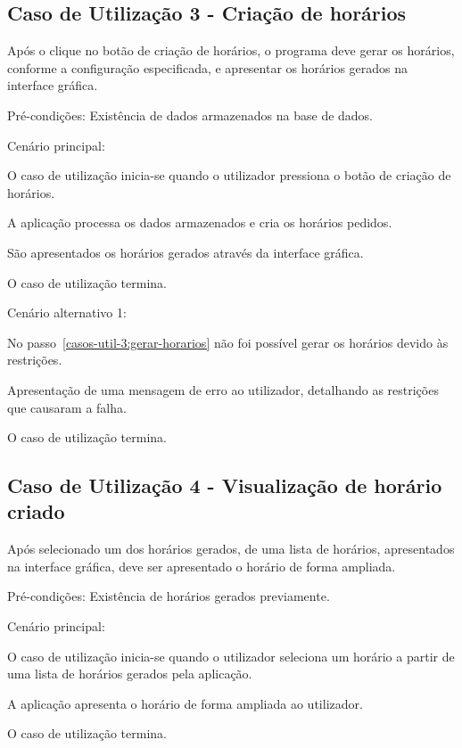 \subsection*{Caso de Utilização 3 - Criação de horários}
Após o clique no botão de criação de horários, o programa deve gerar os horários, conforme a configuração especificada, e apresentar os horários gerados na interface gráfica.

Pré-condições: Existência de dados armazenados na base de dados.

Cenário principal:

\begin{compactenum}
    \item O caso de utilização inicia-se quando o utilizador pressiona o botão de criação de horários.
    \item A aplicação processa os dados armazenados e cria os horários pedidos. \label{casos-util-3:gerar-horarios}
    \item São apresentados os horários gerados através da interface gráfica.
    \item O caso de utilização termina.
\end{compactenum}

Cenário alternativo 1:

\begin{compactenum}
    \item No passo~\ref{casos-util-3:gerar-horarios} não foi possível gerar os horários devido às restrições.
    \item Apresentação de uma mensagem de erro ao utilizador, detalhando as restrições que causaram a falha.
    \item O caso de utilização termina.
\end{compactenum}

\subsection*{Caso de Utilização 4 - Visualização de horário criado}
Após selecionado um dos horários gerados, de uma lista de horários, apresentados na interface gráfica, deve ser apresentado o horário de forma ampliada.

Pré-condições: Existência de horários gerados previamente.

Cenário principal:

\begin{compactenum}
    \item O caso de utilização inicia-se quando o utilizador seleciona um horário a partir de uma lista de horários gerados pela aplicação.
    \item A aplicação apresenta o horário de forma ampliada ao utilizador.
    \item O caso de utilização termina.
\end{compactenum}

